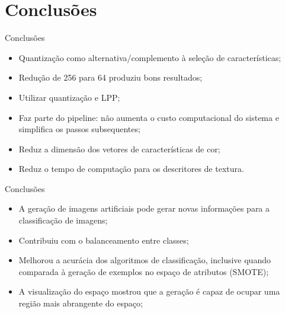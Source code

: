 \documentclass{beamer}
\begin{document}
\section{Conclusões}
\begin{frame}{Conclusões}
  \setlength\leftmargini{1em}
  \begin{itemize}
    \item Quantização como alternativa/complemento à seleção de características;
    \item Redução de 256 para 64 produziu bons resultados;
    \item Utilizar quantização e LPP;
    \item Faz parte do pipeline: não aumenta o custo computacional do sistema e simplifica os passos subsequentes;
    \item Reduz a dimensão dos vetores de características de cor;
    \item Reduz o tempo de computação para os descritores de textura.
  \end{itemize}
\end{frame}
\begin{frame}{Conclusões}
  \begin{itemize}
    \item A geração de imagens artificiais pode gerar novas informações para a classificação de imagens;
    \item Contribuiu com o balanceamento entre classes;
    \item Melhorou a acurácia dos algoritmos de classificação, inclusive quando comparada à geração de exemplos no espaço de atributos (SMOTE);
    \item A visualização do espaço mostrou que a geração é capaz de ocupar uma região mais abrangente do espaço;
  \end{itemize}
\end{frame}
\end{document}
